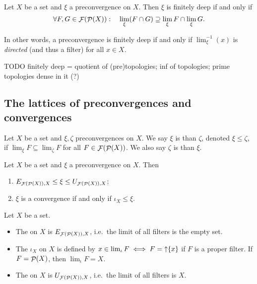 \begin{lemma}
Let $X$ be a set and $\xi$ a preconvergence on $X$. Then $\xi$ is finitely deep \textup{if and only if}
\[ \forall F,G \in \mathop{\mathcal{F}}(\mathop{\mathcal{P}}(X)): \quad \lim_\xi(F\cap G) \supseteq \lim_\xi F \cap \lim_\xi G. \]
\end{lemma}
In other words, a preconvergence is finitely deep \textup{if and only if} $\lim_\xi^{-1}(x)$ is \emph{directed} (and thus a filter) for all $x\in X$.

TODO finitely deep = quotient of (pre)topologies; inf of topologies; prime topologies dense in it (?)

\subsection{The lattices of preconvergences and convergences}
\begin{definition}
Let $X$ be a set and $\xi,\zeta$ preconvergences on $X$. We say $\xi$ is  than $\zeta$, denoted $\xi \leq \zeta$, if $\lim_\xi F \subseteq \lim_\zeta F$ for all $F\in\mathop{\mathcal{F}}(\mathop{\mathcal{P}}(X))$. We also say $\zeta$ is  than $\xi$.
\end{definition}

\begin{lemma}
Let $X$ be a set and $\xi$ a preconvergence on $X$. Then
\begin{enumerate}
\item $E_{\mathop{\mathcal{F}}(\mathop{\mathcal{P}}(X)), X} \leq \xi \leq U_{\mathop{\mathcal{F}}(\mathop{\mathcal{P}}(X)), X}$;
\item $\xi$ is a convergence \textup{if and only if} $\iota_X \leq \xi$.
\end{enumerate}
\end{lemma}

\begin{definition}
Let $X$ be a set.
\begin{itemize}
\item The  on $X$ is $E_{\mathop{\mathcal{F}}(\mathop{\mathcal{P}}(X)), X}$, i.e.\ the limit of all filters is the empty set.
\item The  $\iota_X$ on $X$ is defined by $x \in \lim_\iota F \iff F = \mathop{\uparrow}\{x\}$ if $F$ is a proper filter. If $F = \mathop{\mathcal{P}}(X)$, then $\lim_\iota F = X$.
\item The  on $X$ is $U_{\mathop{\mathcal{F}}(\mathop{\mathcal{P}}(X)), X}$, i.e.\ the limit of all filters is $X$.
\end{itemize}
\end{definition}

